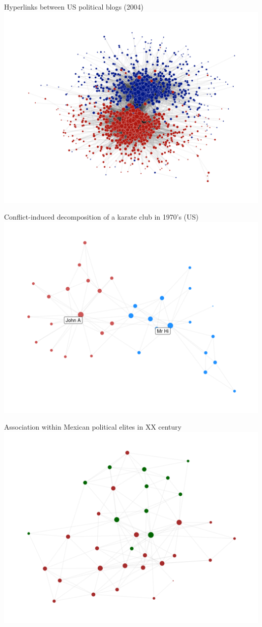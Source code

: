 \documentclass[
    hyperref={colorlinks,linkcolor=blue,urlcolor=blue,citecolor=blue}
]{beamer}
\begin{document}
\begin{frame}{Hyperlinks between US political blogs (2004)}
\centering
\includegraphics[width=.9\textwidth]{overview/polblogs-1}
\end{frame}

\begin{frame}{Conflict-induced decomposition of a karate club in 1970's (US)}
\centering
\includegraphics[width=.9\textwidth]{overview/karate-1}
\end{frame}

\begin{frame}{Association within Mexican political elites in XX century}
\centering
\includegraphics[width=.9\textwidth]{overview/mexican_elites-1}
\end{frame}
\end{document}
